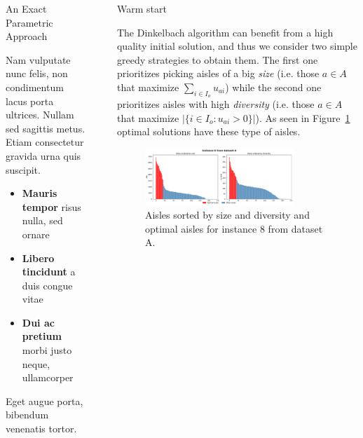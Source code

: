 \documentclass[final]{beamer}
\newlength{\sepwidth}
\newlength{\colwidth}
\newcommand{\separatorcolumn}{\begin{column}{\sepwidth}\end{column}}
\begin{document}
\begin{frame}[t]
\begin{columns}[t]
\begin{column}{\colwidth}
  \begin{block}{An Exact Parametric Approach}

    Nam vulputate nunc felis, non condimentum lacus porta ultrices. Nullam sed
    sagittis metus. Etiam consectetur gravida urna quis suscipit.

    \begin{itemize}
      \item \textbf{Mauris tempor} risus nulla, sed ornare
      \item \textbf{Libero tincidunt} a duis congue vitae
      \item \textbf{Dui ac pretium} morbi justo neque, ullamcorper
    \end{itemize}

    Eget augue porta, bibendum venenatis tortor.

  \end{block}

  

\end{column}

\separatorcolumn

\begin{column}{\colwidth}

  \begin{block}{Warm start}

    The Dinkelbach algorithm can benefit from a high quality initial solution, and thus we consider two simple greedy strategies to obtain them.
    The first one prioritizes picking aisles of a big \textit{size} (i.e. those $a \in A$ that maximize $\sum_{i \in I_o} u_{ai}$) while the second one prioritizes aisles
    with high \textit{diversity} (i.e. those $a \in A$ that maximize $|\{i \in I_o : u_{ai} > 0\}|$). As seen in Figure~\ref{fig:aisles_greedy} optimal solutions have these type of aisles.
    
    \begin{figure}
      \centering
      \includegraphics[width=0.8\textwidth]{greedy_instance_a.pdf}
      \caption{Aisles sorted by size and diversity and optimal aisles for instance 8 from dataset A.}
      \label{fig:aisles_greedy}
    \end{figure}


\end{block}
\end{column}
\end{columns}
\end{frame}
\end{document}
